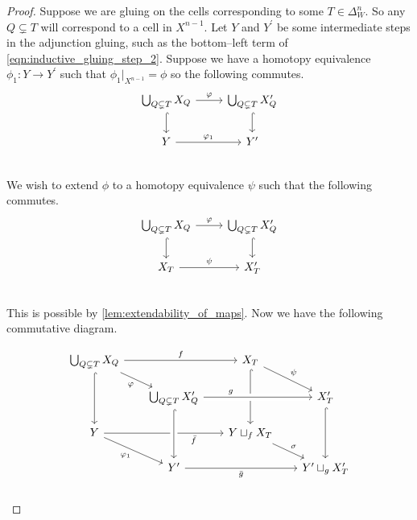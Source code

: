 \documentclass[class=article, crop=false]{standalone}
\begin{document}
\begin{proof}
    Suppose we are gluing on the cells corresponding to some $T \in \Delta_W^n$. So any $Q \subsetneq T$ will correspond to a cell in $X^{n-1}$. Let $Y$ and $Y^\prime$ be some intermediate steps in the adjunction gluing, such as the bottom--left term of \eqref{eqn:inductive_gluing_step_2}. Suppose we have a homotopy equivalence $\phi_1 \colon Y \to Y^\prime$ such that ${\phi_1}|_{X^{n-1}} = \phi$ so the following commutes.
    \begin{equation}
        \begin{tikzcd}
\bigcup_{Q \subsetneq T} X_{Q} \ar[r, "\phi" ] \ar[d, hookrightarrow]     &   \bigcup_{Q \subsetneq T} X^\prime_{Q}  \ar[d, hookrightarrow]       \\
Y  \ar[r, "\phi_1"]                                                                 &   Y^\prime                                                  \\
        \end{tikzcd}
        \label{eqn:commutative_Y_inductive_hyp}  
    \end{equation}
We wish to extend $\phi$ to a homotopy equivalence $\psi$ such that the following commutes.
    \begin{equation*}
        \begin{tikzcd}
\bigcup_{Q \subsetneq T} X_{Q}  \ar[r, "\phi"]             &   \bigcup_{Q \subsetneq T} X^\prime_{Q}                                  \\
X_T \ar[r, "\psi" ] \ar[from = u, hookrightarrow]                                  &   X^\prime_T  \ar[from = u, hookrightarrow]      \\
        \end{tikzcd}
    \end{equation*}
    This is possible by \cref{lem:extendability_of_maps}. Now we have the following commutative diagram.

\begin{equation}
    \begin{tikzcd}[row sep=scriptsize, column sep=scriptsize]
\bigcup_{Q \subsetneq T} X_{Q} \ar[dr, "\phi"'] \ar[rr, "f"] \ar[dd, hookrightarrow]     &  &   X_T \ar[dr, "\psi"] \ar[dd, hookrightarrow]  &  \\
 &   \bigcup_{Q \subsetneq T} X^\prime_{Q} \ar[rr, crossing over, "g" near start] & & X^\prime_T \ar[dd, hookrightarrow]                                    \\
Y \ar[dr, "\phi_1"'] \ar[rr, "\bar{f}"', near end]  &                                                                           &   Y \sqcup_f X_T \ar[dr, "\sigma"]                        &                                   \\
                                                &   Y^\prime \ar[rr, "\bar{g}"']  \ar[from=uu, crossing over, hookrightarrow]    &                                                       &   Y^\prime\sqcup_g X^\prime_T        \\
    \end{tikzcd}
\label{eqn:gluing_commutative_diagram_proof}
\end{equation}


\end{proof}
\end{document}
